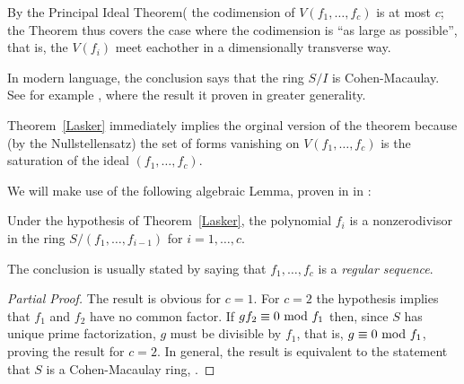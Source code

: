 By the Principal Ideal Theorem(\cite[Theorem ***]{Eisenbud95} the codimension of $V(f_{1},\dots, f_{c})$ is at most $c$;
the Theorem thus covers the case where the codimension is ``as large as possible'', that is, the $V(f_{i})$ meet eachother
in a dimensionally transverse way.

In modern language, the conclusion says that the ring $S/I$ is Cohen-Macaulay. See for example \cite[Chapter 18]{Eisenbud95}, where the result it proven in greater generality.

Theorem~\ref{Lasker} immediately implies the orginal version of the theorem because (by the Nullstellensatz) the set of forms vanishing on $V(f_{1}, \dots, f_{c})$ is the saturation 
of the ideal $(f_{1}, \dots, f_{c})$. 

We will make use of the following algebraic Lemma, proven in  in \cite[Theorem 18.***]{Eisenbud95}:

\begin{lemma}\label{Cohen-Macaulay}
 Under the hypothesis of Theorem~\ref{Lasker}, the polynomial $f_{i}$ is a nonzerodivisor in the ring 
$S/(f_{1}, \dots, f_{i-1})$ for $i = 1, \dots, c$.
\end{lemma}

The conclusion is usually stated by saying that   $f_{1}, \dots, f_{c}$ is a \emph{regular sequence}.

\begin{proof}[Partial Proof]
 The result is obvious for $c=1$. For $c=2$ the hypothesis implies that $f_{1}$ and $f_{2}$ have no common factor.
If $g f_{2} \equiv 0\ {\rm mod}\ f_{1}$ then, since $S$ has unique prime factorization, $g$ must be divisible by
$f_{1}$, that is, $g  \equiv 0\ {\rm mod}\ f_{1}$, proving the result for $c=2$. In general, the result is equivalent to the 
statement that $S$ is a Cohen-Macaulay ring,  \cite[Proposition 18.9]{Eisenbud95}.
\end{proof}


